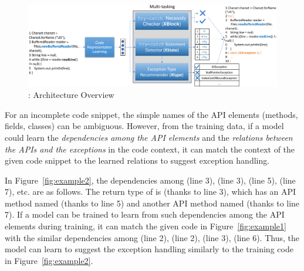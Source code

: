 


\begin{figure}[htp]
\begin{center}
\includegraphics[width=5.65in]{overview-5.png}
\vspace{-10pt}
\caption{{\tool}: Architecture Overview}
\label{overview}
\end{center}
\end{figure}

For an incomplete code snippet, the simple names of the API elements
(methods, fields, classes) can be ambiguous. However, from the
training data, if a model could learn the {\em dependencies among the
  API elements} and the {\em relations between the APIs and the
  exceptions} in the code context, it can match the context of the
given code snippet to the learned relations to suggest exception
handling.

%
In Figure~\ref{fig:example2}, the dependencies among
 (line 3),  (line 3),
 (line 5),  (line 7), etc. are as
follows. The return type of  is
 (thanks to line 3), which has an API method named
 (thanks to line 5) and another API method named
 (thanks to line 7). If a model can be trained to learn from
such dependencies among the API elements during training, it can match
the given code in Figure~\ref{fig:example1} with the similar
dependencies among  (line 2),
 (line 2),  (line
3),  (line 6). Thus, the model can learn to suggest the
exception handling similarly to the training code in
Figure~\ref{fig:example2}.

